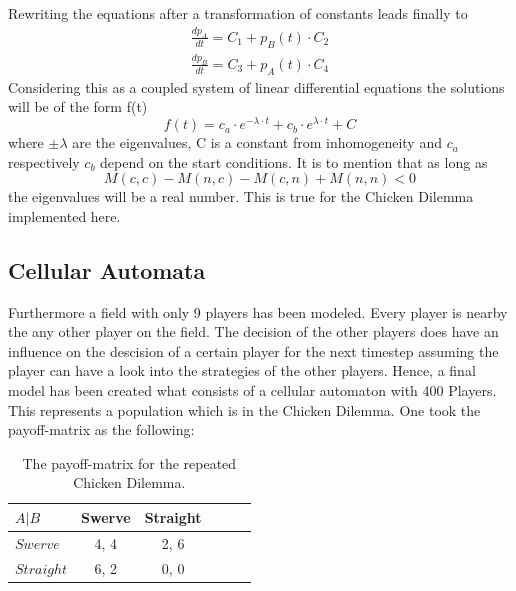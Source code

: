 \documentclass[11pt]{article}
\begin{document}
Rewriting the equations after a transformation of constants leads finally to
\begin{equation}
\begin{split}
\frac{d p_A}{dt} = C_1 + p_B(t) \cdot C_2 \\ \frac{d p_B}{dt} = C_3 + p_A(t) \cdot C_4
\end{split}
\end{equation}
Considering this as a coupled system of linear differential equations the solutions will be of the form f(t)
\newpage
 \begin{equation}
f(t) = c_a \cdot e^{-\lambda \cdot t} + c_b \cdot e^{\lambda \cdot t} + C
\label{dgl}
\end{equation}
where $\pm$$\lambda$ are the eigenvalues, C is a constant from inhomogeneity and  $c_a$ respectively $c_b$ depend on the start conditions.
It is to mention that as long as 
\begin{equation} 
M(c,c) - M(n,c) - M(c,n) + M(n,n) < 0
\end{equation}
 the eigenvalues will be a real number. This is true for the Chicken Dilemma implemented here.


\subsection{Cellular Automata}
Furthermore a field with only 9 players has been modeled. Every player is nearby the any other player on the field. The decision of the other players does have an influence on the descision of a certain player for the next timestep assuming the player can have a look into the strategies of the other players.  Hence, a final model has been created what consists of a cellular automaton with 400 Players. This represents a population which is in the Chicken Dilemma. One took the payoff-matrix as the following:

\begin{table}[htbp]
\centering
\begin{tabular}{|l|c|c|l|c|c|}

\hline
$ A | B $     &     Swerve  &    Straight    \\                           
\hline
$ Swerve $      &  4,  4     &  2,  6  \\
\hline
$ Straight $      &  6,  2    &  0,  0       \\
\hline

                          
\end{tabular}

\label{mytable1} 
\caption{The payoff-matrix for the repeated Chicken Dilemma. }

\end{table}
\end{document}
